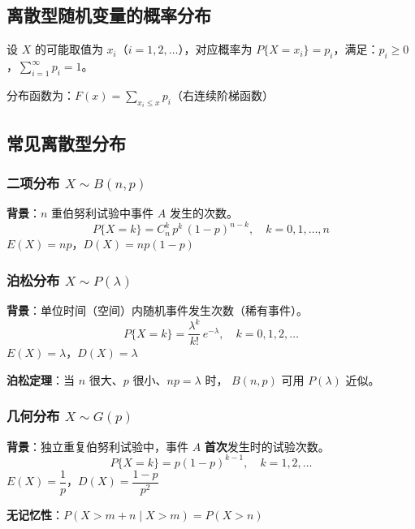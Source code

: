\documentclass[12pt, a4paper]{article}
\begin{document}
\subsection{离散型随机变量的概率分布}

\begin{tcolorbox}[defbox, title={分布律（概率质量函数）}]
    设 $X$ 的可能取值为 $x_i$（$i=1,2,\ldots$），对应概率为
    $P\{X=x_i\}=p_i$，满足：$p_i\ge 0$，$\displaystyle\sum_{i=1}^{\infty}p_i=1$。

    \vspace{4pt}
    分布函数为：$\displaystyle F(x) = \sum_{x_i\le x} p_i$（右连续阶梯函数）
\end{tcolorbox}

\subsection{常见离散型分布}

\subsubsection{二项分布 $X\sim B(n,p)$}

\begin{tcolorbox}[thmbox, title={二项分布}]
    \textbf{背景}：$n$ 重伯努利试验中事件 $A$ 发生的次数。
    \[
        P\{X=k\} = C_n^k\,p^k\,(1-p)^{n-k}, \quad k=0,1,\ldots,n
    \]
    $E(X)=np$，$D(X)=np(1-p)$
\end{tcolorbox}

\subsubsection{泊松分布 $X\sim P(\lambda)$}

\begin{tcolorbox}[thmbox, title={泊松分布}]
    \textbf{背景}：单位时间（空间）内随机事件发生次数（稀有事件）。
    \[
        P\{X=k\} = \frac{\lambda^k}{k!}\,e^{-\lambda}, \quad k=0,1,2,\ldots
    \]
    $E(X)=\lambda$，$D(X)=\lambda$

    \textbf{泊松定理}：当 $n$ 很大、$p$ 很小、$np=\lambda$ 时，
    $B(n,p)$ 可用 $P(\lambda)$ 近似。
\end{tcolorbox}

\subsubsection{几何分布 $X\sim G(p)$}

\begin{tcolorbox}[thmbox, title={几何分布}]
    \textbf{背景}：独立重复伯努利试验中，事件 $A$ \textbf{首次}发生时的试验次数。
    \[
        P\{X=k\} = p(1-p)^{k-1}, \quad k=1,2,\ldots
    \]
    $E(X)=\dfrac{1}{p}$，$D(X)=\dfrac{1-p}{p^2}$

    \textbf{无记忆性}：$P(X>m+n\mid X>m)=P(X>n)$
\end{tcolorbox}
\end{document}

